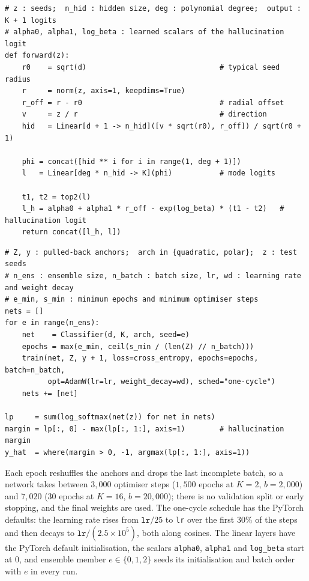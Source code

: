 \begin{algorithm}[htbp]
\caption{Polar classifier: logits of a seed.}
\label{alg:app-polar}
\begin{lstlisting}[style=appcode]
# z : seeds;  n_hid : hidden size, deg : polynomial degree;  output : K + 1 logits
# alpha0, alpha1, log_beta : learned scalars of the hallucination logit
def forward(z):
    r0    = sqrt(d)                               # typical seed radius
    r     = norm(z, axis=1, keepdims=True)
    r_off = r - r0                                # radial offset
    v     = z / r                                 # direction
    hid   = Linear[d + 1 -> n_hid]([v * sqrt(r0), r_off]) / sqrt(r0 + 1)

    phi = concat([hid ** i for i in range(1, deg + 1)])
    l   = Linear[deg * n_hid -> K](phi)           # mode logits

    t1, t2 = top2(l)
    l_h = alpha0 + alpha1 * r_off - exp(log_beta) * (t1 - t2)   # hallucination logit
    return concat([l_h, l])
\end{lstlisting}
\end{algorithm}

\begin{algorithm}[htbp]
\caption{Training and prediction of the quadratic and polar classifiers.}
\label{alg:app-param-train}
\begin{lstlisting}[style=appcode]
# Z, y : pulled-back anchors;  arch in {quadratic, polar};  z : test seeds
# n_ens : ensemble size, n_batch : batch size, lr, wd : learning rate and weight decay
# e_min, s_min : minimum epochs and minimum optimiser steps
nets = []
for e in range(n_ens):
    net    = Classifier(d, K, arch, seed=e)
    epochs = max(e_min, ceil(s_min / (len(Z) // n_batch)))
    train(net, Z, y + 1, loss=cross_entropy, epochs=epochs, batch=n_batch,
          opt=AdamW(lr=lr, weight_decay=wd), sched="one-cycle")
    nets += [net]

lp     = sum(log_softmax(net(z)) for net in nets)
margin = lp[:, 0] - max(lp[:, 1:], axis=1)        # hallucination margin
y_hat  = where(margin > 0, -1, argmax(lp[:, 1:], axis=1))
\end{lstlisting}
\end{algorithm}

Each epoch reshuffles the anchors and drops the last incomplete batch, so a network takes between
$3{,}000$ optimiser steps ($1{,}500$ epochs at $K = 2$, $b = 2{,}000$) and $7{,}020$ ($30$ epochs
at $K = 16$, $b = 20{,}000$); there is no validation split or early stopping, and the final weights
are used. The one-cycle schedule has the PyTorch defaults: the learning rate rises from
$\texttt{lr}/25$ to \texttt{lr} over the first $30\%$ of the steps and then decays to
$\texttt{lr}/(2.5\times10^{5})$, both along cosines. The linear layers have the PyTorch default
initialisation, the scalars \texttt{alpha0}, \texttt{alpha1} and \texttt{log\_beta} start at $0$,
and ensemble member $e \in \{0, 1, 2\}$ seeds its initialisation and batch order with $e$ in every
run.

